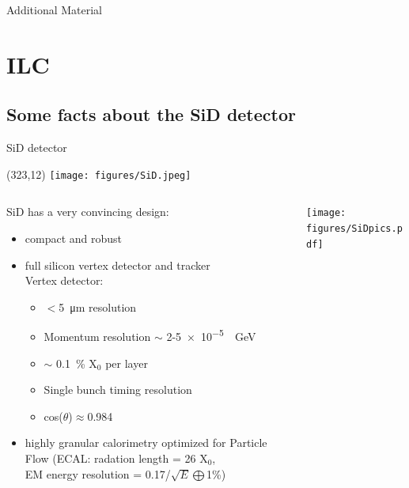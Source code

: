 \documentclass[xcolor={dvipsnames}]{beamer}
\newcommand{\sidlogo}{
  \setlength{\TPHorizModule}{1pt}
  \setlength{\TPVertModule}{1pt}
  \begin{textblock}{1}(323,12)
   \texttt{[image: figures/SiD.jpeg]}
  \end{textblock}
  }
\begin{document}
\appendix

\begin{frame}
\begin{center}
\LARGE Additional Material
\end{center}
  \tableofcontents
\end{frame}

\section{ILC}

\subsection{Some facts about the SiD detector}
\begin{frame}{SiD detector}
\sidlogo
 \begin{columns}
  \begin{column}{0.7\textwidth}
    SiD has a very convincing design:
 \begin{itemize}
  \item compact and robust
  \item full silicon vertex detector and tracker\\
  Vertex detector:
  \begin{itemize}
   \item $<$\SI{5}{\micro\metre} resolution
   \item Momentum resolution $\sim$ 2-\SI{5e-5}{\per\giga\electronvolt}
   \item $\sim$ \SI{0.1}{\percent} X$_0$ per layer
    \item Single bunch timing resolution
    \item cos($\theta$)$\approx$0.984
  \end{itemize}
  \item highly granular calorimetry optimized for Particle Flow (ECAL: radation length = 26 X$_0$, \\EM energy resolution = 0.17/$\sqrt{E}\bigoplus$1\%)
 \end{itemize}
  \end{column}
  \begin{column}{0.3\textwidth}
    \begin{flushright}
  \texttt{[image: figures/SiDpics.pdf]}
 \end{flushright}
  \end{column}
 \end{columns}

\end{frame}
\end{document}
